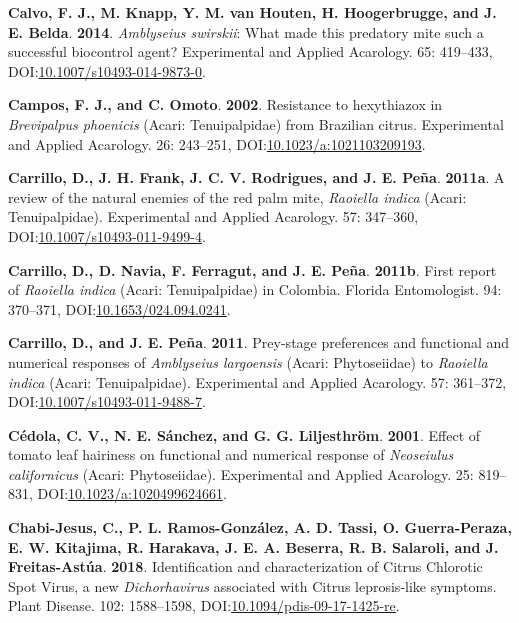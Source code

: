 \documentclass[12pt,final,CPage]{ufthesis}
\newlength{\cslhangindent}
\newenvironment{CSLReferences}[2] %
{%
	\setlength{\parindent}{0pt}
	\ifodd #1 \everypar{\setlength{\hangindent}{\cslhangindent}}\ignorespaces\fi
	\ifnum #2 > 0
	\setlength{\parskip}{#2\baselineskip}
	\fi
}%
{}
\begin{document}
{\begin{CSLReferences}{1}{0}
  \leavevmode{}%
  \textbf{Calvo, F. J., M. Knapp, Y. M. van Houten, H. Hoogerbrugge, and J. E. Belda}. \textbf{2014}. {\emph{Amblyseius swirskii}}: What made this predatory mite such a successful biocontrol agent? Experimental and Applied Acarology. 65: 419--433, DOI:\href{https://doi.org/10.1007/s10493-014-9873-0}{10.1007/s10493-014-9873-0}.

  \leavevmode{}%
  \textbf{Campos, F. J., and C. Omoto}. \textbf{2002}. Resistance to hexythiazox in {\emph{Brevipalpus phoenicis}} ({Acari}: {Tenuipalpidae}) from {Brazilian} citrus. Experimental and Applied Acarology. 26: 243--251, DOI:\href{https://doi.org/10.1023/a:1021103209193}{10.1023/a:1021103209193}.

  \leavevmode{}%
  \textbf{Carrillo, D., J. H. Frank, J. C. V. Rodrigues, and J. E. Peña}. \textbf{2011a}. A review of the natural enemies of the red palm mite, {\emph{Raoiella indica}} ({Acari}: {Tenuipalpidae}). Experimental and Applied Acarology. 57: 347--360, DOI:\href{https://doi.org/10.1007/s10493-011-9499-4}{10.1007/s10493-011-9499-4}.

  \leavevmode{}%
  \textbf{Carrillo, D., D. Navia, F. Ferragut, and J. E. Peña}. \textbf{2011b}. First report of {\emph{Raoiella indica}} ({Acari}: {Tenuipalpidae}) in {Colombia}. Florida Entomologist. 94: 370--371, DOI:\href{https://doi.org/10.1653/024.094.0241}{10.1653/024.094.0241}.

  \leavevmode{}%
  \textbf{Carrillo, D., and J. E. Peña}. \textbf{2011}. Prey-stage preferences and functional and numerical responses of {\emph{Amblyseius largoensis}} ({Acari: Phytoseiidae}) to {\emph{Raoiella indica}} ({Acari}: {Tenuipalpidae}). Experimental and Applied Acarology. 57: 361--372, DOI:\href{https://doi.org/10.1007/s10493-011-9488-7}{10.1007/s10493-011-9488-7}.

  \leavevmode{}%
  \textbf{Cédola, C. V., N. E. Sánchez, and G. G. Liljesthröm}. \textbf{2001}. Effect of tomato leaf hairiness on functional and numerical response of {\emph{Neoseiulus californicus}} ({Acari}: {Phytoseiidae}). Experimental and Applied Acarology. 25: 819--831, DOI:\href{https://doi.org/10.1023/a:1020499624661}{10.1023/a:1020499624661}.

  \leavevmode{}%
  \textbf{Chabi-Jesus, C., P. L. Ramos-González, A. D. Tassi, O. Guerra-Peraza, E. W. Kitajima, R. Harakava, J. E. A. Beserra, R. B. Salaroli, and J. Freitas-Astúa}. \textbf{2018}. Identification and characterization of {Citrus Chlorotic Spot Virus}, a new {\emph{Dichorhavirus}} associated with {Citrus leprosis}-like symptoms. Plant Disease. 102: 1588--1598, DOI:\href{https://doi.org/10.1094/pdis-09-17-1425-re}{10.1094/pdis-09-17-1425-re}.


\end{CSLReferences}}
\end{document}
